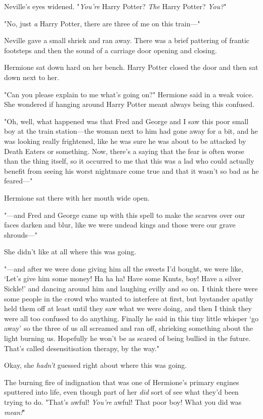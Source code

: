 Neville's eyes widened. "\emph{You're} Harry Potter? \emph{The} Harry Potter?
\emph{You?}"

"No, just \emph{a} Harry Potter, there are three of me on this train---"

Neville gave a small shriek and ran away. There was a brief pattering of
frantic footsteps and then the sound of a carriage door opening and closing.

Hermione sat down hard on her bench. Harry Potter closed the door and then sat
down next to her.

"Can you please explain to me what's going on?" Hermione said in a weak voice.
She wondered if hanging around Harry Potter meant always being this confused.

"Oh, well, what happened was that Fred and George and I saw this poor small boy
at the train station---the woman next to him had gone away for a bit, and he
was looking really frightened, like he was sure he was about to be attacked by
Death Eaters or something. Now, there's a saying that the fear is often worse
than the thing itself, so it occurred to me that this was a lad who could
actually benefit from seeing his worst nightmare come true and that it wasn't
so bad as he feared---"

Hermione sat there with her mouth wide open.

"---and Fred and George came up with this spell to make the scarves over our
faces darken and blur, like we were undead kings and those were our grave
shrouds---"

She didn't like at all where this was going.

"---and after we were done giving him all the sweets I'd bought, we were like,
`Let's give him some money! Ha ha ha! Have some Knuts, boy! Have a silver
Sickle!' and dancing around him and laughing evilly and so on. I think there
were some people in the crowd who wanted to interfere at first, but bystander
apathy held them off at least until they saw what we were doing, and then I
think they were all too confused to do anything. Finally he said in this tiny
little whisper `go away' so the three of us all screamed and ran off, shrieking
something about the light burning us. Hopefully he won't be as scared of being
bullied in the future. That's called desensitisation therapy, by the way."

Okay, she \emph{hadn't} guessed right about where this was going.

The burning fire of indignation that was one of Hermione's primary engines
sputtered into life, even though part of her \emph{did} sort of see what they'd
been trying to do. "That's awful! \emph{You're} awful! That poor boy! What you
did was \emph{mean!}"

